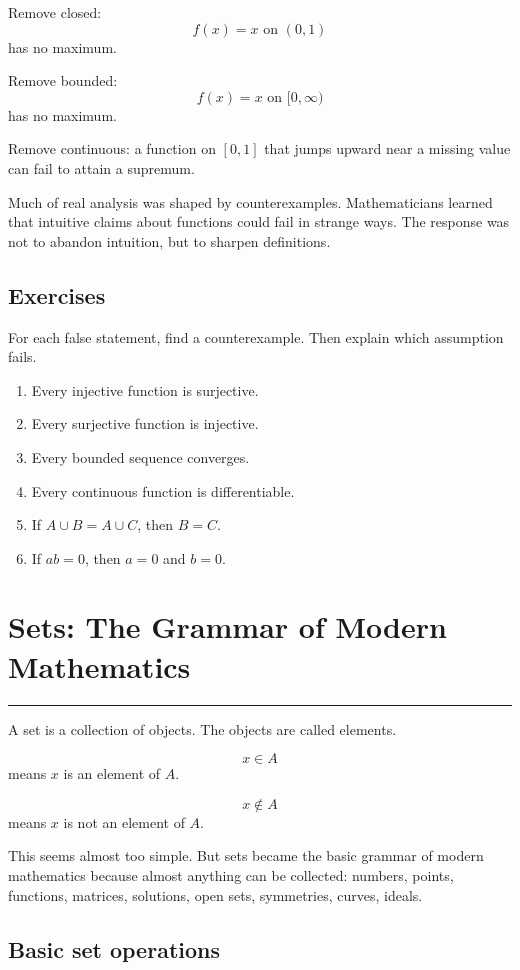 \documentclass[12pt]{article}
\newcommand{\chapterline}{\vspace{0.4em}\hrule\vspace{0.8em}}
\begin{document}
Remove closed:
\[
f(x)=x \text{ on } (0,1)
\]
has no maximum.

Remove bounded:
\[
f(x)=x \text{ on } [0,\infty)
\]
has no maximum.

Remove continuous:
a function on $[0,1]$ that jumps upward near a missing value can fail to attain a supremum.

\begin{historybox}
Much of real analysis was shaped by counterexamples. Mathematicians learned that intuitive claims about functions could fail in strange ways. The response was not to abandon intuition, but to sharpen definitions.
\end{historybox}

\subsection{Exercises}

For each false statement, find a counterexample. Then explain which assumption fails.

\begin{enumerate}
\item Every injective function is surjective.
\item Every surjective function is injective.
\item Every bounded sequence converges.
\item Every continuous function is differentiable.
\item If $A\cup B=A\cup C$, then $B=C$.
\item If $ab=0$, then $a=0$ and $b=0$.
\end{enumerate}

\newpage
\section{Sets: The Grammar of Modern Mathematics}
\chapterline

A set is a collection of objects. The objects are called elements.

\[
x\in A
\]
means $x$ is an element of $A$.

\[
x\notin A
\]
means $x$ is not an element of $A$.

This seems almost too simple. But sets became the basic grammar of modern mathematics because almost anything can be collected: numbers, points, functions, matrices, solutions, open sets, symmetries, curves, ideals.

\subsection{Basic set operations}
\end{document}
